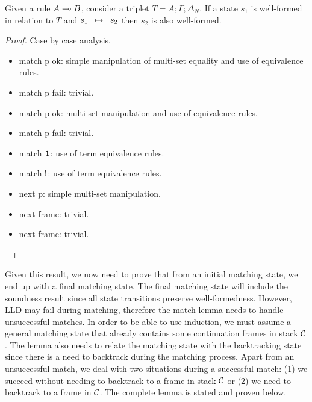 \begin{theorem}
Given a rule $A \multimap B$, consider a triplet $T = A; \Gamma; \Delta_{N}$.
If a state $s_1$ is well-formed in relation to $T$ and $s_1 \;\; \mapsto \;\; s_2$ then
$s_2$ is also well-formed.
\end{theorem}
\begin{proof}
Case by case analysis.
\begin{itemize}
\item match p ok: simple manipulation of multi-set equality and use of
equivalence rules.
\item match p fail: trivial.
\item match \bang p ok: multi-set manipulation and use of
equivalence rules.
\item match \bang p fail: trivial.
\item match $\mathbf{1}$: use of term equivalence rules.
\item match ${!}$: use of term equivalence rules.
\item next p: simple multi-set manipulation.
\item next frame: trivial.
\item next \bang frame: trivial.
\end{itemize}
\end{proof}

Given this result, we now need to prove that from an initial matching state, we
end up with a final matching state. The final matching state will include the
soundness result since all state transitions preserve well-formedness.
However, LLD may fail during matching, therefore the match lemma needs to handle
unsuccessful matches. In order to be able to use induction, we must assume a
general matching state that  already contains some continuation frames in
stack $\mathcal{C}$. The lemma also needs to relate the matching state with the
backtracking state since there is a need to backtrack during the matching
process. Apart from an unsuccessful match, we deal with two situations
during a successful match: (1) we succeed without needing to backtrack to a
frame in stack $\mathcal{C}$ or (2) we need to backtrack to a frame in
$\mathcal{C}$. The complete lemma is stated and proven below.


